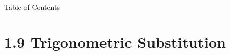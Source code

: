 

 \begin{frame}{Table of Contents }
\mapofcontentsA{\ai,\atech}
 \end{frame}

\section{1.9 Trigonometric Substitution}

